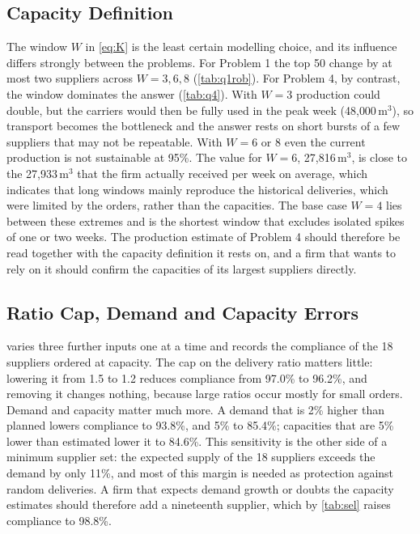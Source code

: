 \documentclass[11pt,a4paper]{article}
\begin{document}
\subsection{Capacity Definition}\label{sec:sens-window}
The window $W$ in \cref{eq:K} is the least certain modelling choice, and its influence differs strongly between the problems.
For Problem 1 the top 50 change by at most two suppliers across $W=3,6,8$ (\cref{tab:q1rob}).
For Problem 4, by contrast, the window dominates the answer (\cref{tab:q4}).
With $W=3$ production could double, but the carriers would then be fully used in the peak week (48{,}000\,m$^3$), so transport becomes the bottleneck and the answer rests on short bursts of a few suppliers that may not be repeatable.
With $W=6$ or $8$ even the current production is not sustainable at 95\%. The value for $W=6$, 27{,}816\,m$^3$, is close to the 27{,}933\,m$^3$ that the firm actually received per week on average, which indicates that long windows mainly reproduce the historical deliveries, which were limited by the orders, rather than the capacities.
The base case $W=4$ lies between these extremes and is the shortest window that excludes isolated spikes of one or two weeks.
The production estimate of Problem 4 should therefore be read together with the capacity definition it rests on, and a firm that wants to rely on it should confirm the capacities of its largest suppliers directly.

\subsection{Ratio Cap, Demand and Capacity Errors}\label{sec:sens-param}
 varies three further inputs one at a time and records the compliance of the 18 suppliers ordered at capacity.
The cap on the delivery ratio matters little: lowering it from 1.5 to 1.2 reduces compliance from 97.0\% to 96.2\%, and removing it changes nothing, because large ratios occur mostly for small orders.
Demand and capacity matter much more.
A demand that is 2\% higher than planned lowers compliance to 93.8\%, and 5\% to 85.4\%; capacities that are 5\% lower than estimated lower it to 84.6\%.
This sensitivity is the other side of a minimum supplier set: the expected supply of the 18 suppliers exceeds the demand by only 11\%, and most of this margin is needed as protection against random deliveries.
A firm that expects demand growth or doubts the capacity estimates should therefore add a nineteenth supplier, which by \cref{tab:sel} raises compliance to 98.8\%.
\end{document}
